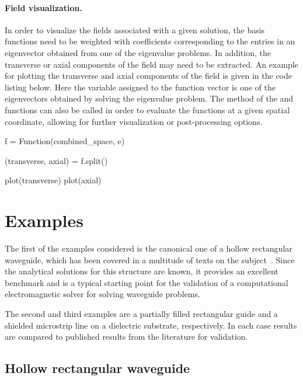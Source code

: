 \paragraph{Field visualization.}

In order to visualize the fields associated with a given solution, the
basis functions need to be weighted with coefficients corresponding to
the entries in an eigenvector obtained from one of the eigenvalue
problems. In addition, the transverse or axial components of the field
may need to be extracted. An example for plotting the transverse and
axial components of the field is given in the code listing below.
Here the variable  assigned to the function vector is one of
the eigenvectors obtained by solving the eigenvalue
problem. The  method of the  and 
functions can also be called in order to evaluate the functions at a
given spatial coordinate, allowing for further visualization or
post-processing options.
\begin{python}
f = Function(combined_space, e)

(transverse, axial) = f.split()

plot(transverse)
plot(axial)
\end{python}

\section{Examples}
\label{lezar:sec:Examples}

The first of the examples considered is the canonical one of a hollow
rectangular waveguide, which has been covered in a multitude of texts
on the subject~\citep{Davidson2011, Jin2002,
PelosiCoccioliSelleri1998, Pozar2005}. Since the analytical solutions
for this structure are known, it provides an excellent benchmark and
is a typical starting point for the validation of a computational
electromagnetic solver for solving waveguide problems.

The second and third examples are a partially filled rectangular guide
and a shielded microstrip line on a dielectric substrate,
respectively. In each case results are compared to published results
from the literature for validation.

\subsection{Hollow rectangular waveguide}

